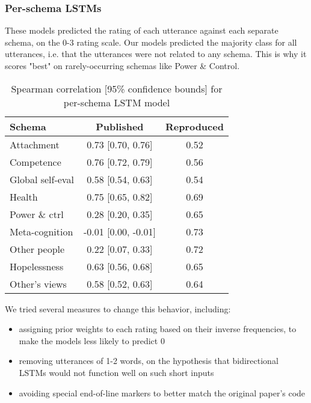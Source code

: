 \documentclass[11pt,a4paper]{article}
\begin{document}
\subsubsection{Per-schema LSTMs}
\label{section:per_schema_rnn}
These models predicted the rating of each utterance against each separate schema, on the 0-3 rating scale. Our models predicted the majority class for all utterances, i.e. that the utterances were not related to any schema. This is why it scores "best" on rarely-occurring schemas like Power \& Control.

\begin{table}[H]
\centering
\begin{tabular}{lcc}
\toprule
Schema                  &Published          &Reproduced \\
\midrule
Attachment              & 0.73 [0.70, 0.76]  & 0.52 \\
Competence              & 0.76 [0.72, 0.79]  & 0.56 \\
Global self-eval        & 0.58 [0.54, 0.63]  & 0.54 \\
Health                  & 0.75 [0.65, 0.82]  & 0.69 \\
Power \& ctrl           & 0.28 [0.20, 0.35]  & 0.65 \\
Meta-cognition          & -0.01 [0.00, -0.01]& 0.73 \\
Other people            & 0.22 [0.07, 0.33]  & 0.72 \\
Hopelessness            & 0.63 [0.56, 0.68]  & 0.65 \\
Other's views           & 0.58 [0.52, 0.63]  & 0.64 \\
\bottomrule
\end{tabular}
\caption{Spearman correlation [95\% confidence bounds] for per-schema LSTM model}
\label{tab:per_schema_lstm}
\end{table}

We tried several measures to change this behavior, including:
\begin{itemize}
  \item assigning prior weights to each rating based on their inverse frequencies, to make the models less likely to predict 0
  \item removing utterances of 1-2 words, on the hypothesis that bidirectional LSTMs would not function well on such short inputs
  \item avoiding special end-of-line markers to better match the original paper's code
\end{itemize}
\end{document}
